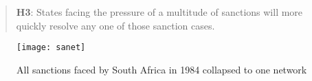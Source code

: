 \begin{quote}
	\textbf{H3}: States facing the pressure of a multitude of sanctions will more quickly resolve any one of those sanction cases.
\end{quote}

\begin{figure}[ht]
	\centering
	\texttt{[image: sanet]}
	\caption{All sanctions faced by South Africa in 1984 collapsed to one network}
	\label{fig:sanet}
\end{figure}
\FloatBarrier